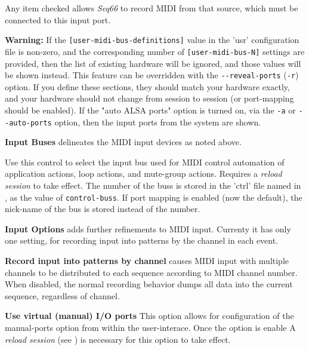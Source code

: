    Any item checked allows \textsl{Seq66} to record MIDI from that source,
   which must be connected to this input port.

   \textbf{Warning:}
   If the 
   \texttt{[user-midi-bus-definitions]} value in the 'usr' configuration file
   is non-zero, and the
   corresponding number of
   \texttt{[user-midi-bus-N]} settings are provided, then
   the list of existing hardware will be ignored, and those values will be
   shown instead.
   This feature can be overridden with the
   \texttt{-{}-reveal-ports} (\texttt{-r}) option.
   If you define these sections, they should match your
   hardware exactly, and your hardware should not change from session to
   session (or port-mapping should be enabled).
   If the "auto ALSA ports" option is turned on, via the \texttt{-a} or
   \texttt{-{}-auto-ports} option, then
   the input ports from the system are shown.

   \setcounter{ItemCounter}{0}      %

   \textbf{Input Buses} delineates the MIDI input devices as noted above.

   Use this control to select the input bus used for MIDI control automation of 
   application actions, loop actions, and mute-group actions.
   Requires a \textsl{reload session} to take effect.
   The number of the buss is stored in the 'ctrl' file named in
   ,
   as the value of \texttt{control-buss}.
   If port mapping is enabled (now the default),
   the nick-name of the bus is stored instead of the number.

   \textbf{Input Options} adds further refinements to MIDI input.
   Currenty it has only one setting, for recording input into patterns by the
   channel in each event.

   \textbf{Record input into patterns by channel}
   causes MIDI input with multiple channels to be distributed to
   each sequence according to MIDI channel number.
   When disabled, the normal recording behavior dumps all data into the current
   sequence, regardless of channel.

   \textbf{Use virtual (manual) I/O ports}
   This option
   allows for configuration of the manual-ports option from within the
   user-interace. 
   Once the option is enable
   A \textsl{reload session} (see )
   is necessary for this option to take effect.

